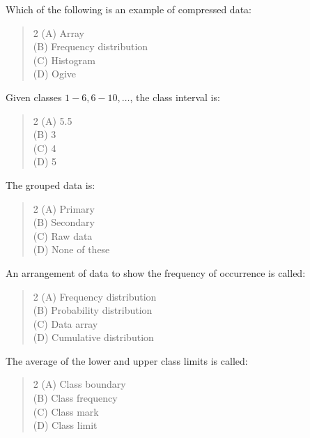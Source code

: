 \documentclass[11pt,a4paper]{article}
\begin{document}
\begin{mcqlist}
\item Which of the following is an example of compressed data:
\begin{quote}\begin{multicols}{2}
\noindent (A) Array \\
(B) Frequency distribution \\
(C) Histogram \\
(D) Ogive
\end{multicols}\end{quote}

\item Given classes $1-6, 6-10,\ldots$, the class interval is:
\begin{quote}\begin{multicols}{2}
\noindent (A) 5.5 \\
(B) 3 \\
(C) 4 \\
(D) 5
\end{multicols}\end{quote}

\item The grouped data is:
\begin{quote}\begin{multicols}{2}
\noindent (A) Primary \\
(B) Secondary \\
(C) Raw data \\
(D) None of these
\end{multicols}\end{quote}

\item An arrangement of data to show the frequency of occurrence is called:
\begin{quote}\begin{multicols}{2}
\noindent (A) Frequency distribution \\
(B) Probability distribution \\
(C) Data array \\
(D) Cumulative distribution
\end{multicols}\end{quote}

\item The average of the lower and upper class limits is called:
\begin{quote}\begin{multicols}{2}
\noindent (A) Class boundary \\
(B) Class frequency \\
(C) Class mark \\
(D) Class limit
\end{multicols}\end{quote}


\end{mcqlist}
\end{document}
